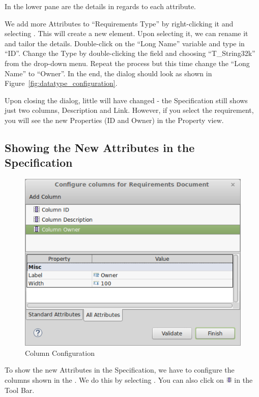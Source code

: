 In the lower pane are the details in regards to each attribute.

We add more Attributes to ``Requirements Type'' by right-clicking it and selecting .  This will create a new element.  Upon selecting it, we can rename it and tailor the details.  Double-click on the ``Long Name'' variable and type in ``ID''.  Change the Type by double-clicking the field and choosing ``T\_String32k'' from the drop-down menu.  Repeat the process but this time change the ``Long Name'' to ``Owner''.  In the end, the dialog should look as shown in Figure~\ref{fig:datatype_configuration}.

Upon closing the dialog, little will have changed - the Specification still shows just two columns, Description and Link.  However, if you select the requirement, you will see the new Properties (ID and Owner) in the Property view.

\subsection{Showing the New Attributes in the Specification}

\begin{figure}
\centering      
\includegraphics[width=0.8\linewidth]{../rmf-images/columnconfig.png}      
\caption{Column Configuration}
\label{fig:column_configuration}
\end{figure}

To show the new Attributes in the Specification, we have to configure the columns shown in the .  We do this by selecting .  You can also click on \includegraphics[height=0.8em]{../rmf-images/icons/full/obj16/Column.png} in the Tool Bar.

